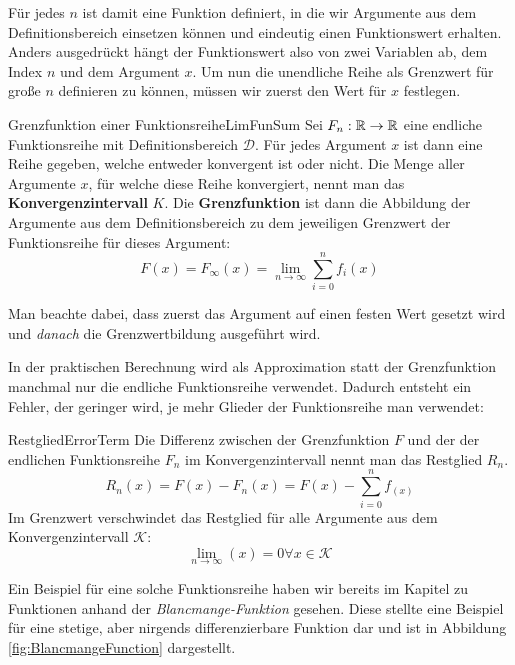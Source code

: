Für jedes $n$ ist damit eine Funktion definiert, in die wir Argumente aus dem Definitionsbereich einsetzen können und eindeutig einen Funktionswert erhalten. Anders ausgedrückt hängt der Funktionswert also von zwei Variablen ab, dem Index $n$ und dem Argument $x$. Um nun die unendliche Reihe als Grenzwert für große $n$ definieren zu können, müssen wir zuerst den Wert für $x$ festlegen.

\begin{definition}{Grenzfunktion einer Funktionsreihe}{LimFunSum}
    Sei $F_n: \mathbb{R} \to \mathbb{R}$ eine endliche Funktionsreihe mit Definitionsbereich $\mathcal{D}$. Für jedes Argument $x$ ist dann eine Reihe gegeben, welche entweder konvergent ist oder nicht. Die Menge aller Argumente $x$, für welche diese Reihe konvergiert, nennt man das \textbf{Konvergenzintervall} $K$. Die \textbf{Grenzfunktion} ist dann die Abbildung der Argumente aus dem Definitionsbereich zu dem jeweiligen Grenzwert der Funktionsreihe für dieses Argument:
    $$
        F(x) = F_\infty(x) = \lim\limits_{n\to\infty} \sum\limits_{i=0}^n f_i(x)
    $$
\end{definition}

Man beachte dabei, dass zuerst das Argument auf einen festen Wert gesetzt wird und \emph{danach} die Grenzwertbildung ausgeführt wird.

In der praktischen Berechnung wird als Approximation statt der Grenzfunktion manchmal nur die endliche Funktionsreihe verwendet. Dadurch entsteht ein Fehler, der geringer wird, je mehr Glieder der Funktionsreihe man verwendet:

\begin{definition}{Restglied}{ErrorTerm}
    Die Differenz zwischen der Grenzfunktion $F$ und der der endlichen Funktionsreihe $F_n$ im Konvergenzintervall nennt man das Restglied $R_n$.
    $$
        R_n(x) = F(x) - F_n(x) = F(x) - \sum\limits_{i=0}^n f_(x)
    $$
    Im Grenzwert verschwindet das Restglied für alle Argumente aus dem Konvergenzintervall $\mathcal{K}$:
    $$
        \lim\limits_{n\to\infty}(x) = 0 \forall x \in \mathcal{K}
    $$
\end{definition}

Ein Beispiel für eine solche Funktionsreihe haben wir bereits im Kapitel zu Funktionen anhand der \emph{Blancmange-Funktion} gesehen. Diese stellte eine Beispiel für eine stetige, aber nirgends differenzierbare Funktion dar und ist in Abbildung \ref{fig:BlancmangeFunction} dargestellt.

